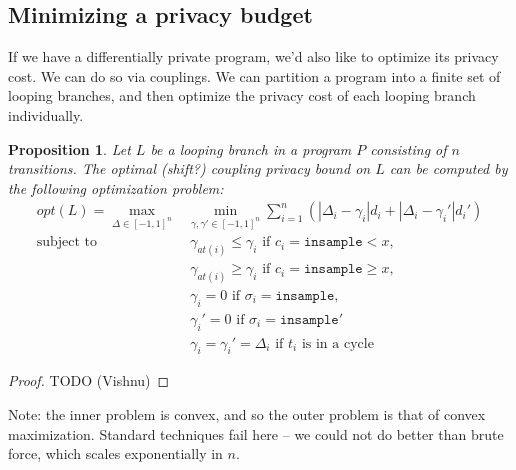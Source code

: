 \documentclass[12pt]{article}
\newcommand{\gguard}[1][x]{\texttt{insample}\geq #1}
\newcommand{\lguard}[1][x]{\texttt{insample} < #1}
\newtheorem{prop}[thm]{Proposition}
\theoremstyle{definition}
\begin{document}
\subsection{Minimizing a privacy budget}

If we have a differentially private program, we'd also like to optimize its privacy cost. We can do so via couplings. We can partition a program into a finite set of looping branches, and then optimize the privacy cost of each looping branch individually.

\begin{prop}
    Let $L$ be a looping branch in a program $P$ consisting of $n$ transitions. The optimal {\color{red} (shift?)} coupling privacy bound on $L$ can be computed by the following optimization problem: 
    \begin{align*}
        opt(L) = \max_{\Delta \in [-1, 1]^n} &\min_{\gamma, \gamma' \in [-1, 1]^n} \sum_{i = 1}^n \left(|\Delta_i - \gamma_i| d_i + |\Delta_i - \gamma_i'|d_i' \right)\\ 
            \text{subject to }
            &\ \gamma_{at(i)} \leq \gamma_i \text{ if } c_i = \lguard, \\
            &\ \gamma_{at(i)} \geq \gamma_i \text{ if } c_i = \gguard, \\
            &\ \gamma_i = 0 \text{ if } \sigma_i = \texttt{insample}, \\
            &\ \gamma_i' = 0 \text{ if } \sigma_i = \texttt{insample}'\\
            &\ \gamma_i = \gamma_i'= \Delta_i \text{ if } t_i \text{ is in a cycle}
    \end{align*}
\end{prop}

\begin{proof}
    TODO (Vishnu)
\end{proof}

Note: the inner problem is convex, and so the outer problem is that of convex maximization. Standard techniques fail here -- we could not do better than brute force, which scales exponentially in $n$.
\end{document}
